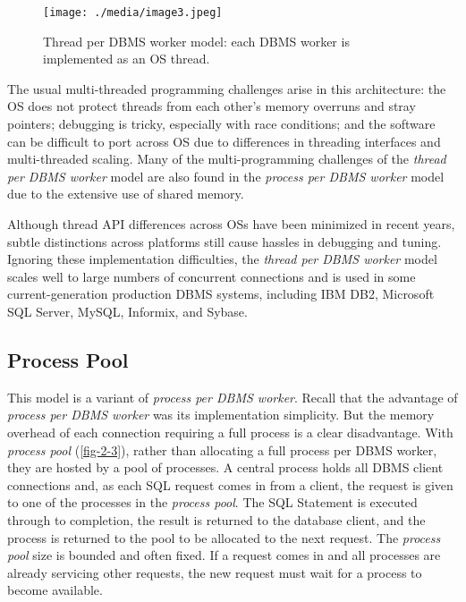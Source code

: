 \documentclass[a4paper,11pt,twoside,openright]{book}
\begin{document}
\begin{figure}
\centering
\texttt{[image: ./media/image3.jpeg]}

\caption{Thread per DBMS worker model: each DBMS worker is implemented
as an OS thread.\label{fig-2-2}}
\end{figure}

The usual multi-threaded programming challenges arise in this
architecture: the OS does not protect threads from each other's memory
overruns and stray pointers; debugging is tricky, especially with race
conditions; and the software can be difficult to port across OS due to
differences in threading interfaces and multi-threaded scaling. Many of
the multi-programming challenges of the \emph{thread per DBMS worker}
model are also found in the \emph{process per DBMS worker} model due to
the extensive use of shared memory.

Although thread API differences across OSs have been minimized in recent
years, subtle distinctions across platforms still cause hassles in
debugging and tuning. Ignoring these implementation difficulties, the
\emph{thread per DBMS worker} model scales well to large numbers of
concurrent connections and is used in some current-generation
production DBMS systems, including IBM DB2, Microsoft SQL Server, MySQL,
Informix, and Sybase.

\hypertarget{process-pool}{%
\subsection{Process Pool}\label{process-pool}}

This model is a variant of \emph{process per DBMS worker}. Recall that
the advantage of \emph{process per DBMS worker} was its implementation
simplicity. But the memory overhead of each connection requiring a full
process is a clear disadvantage. With \emph{process pool} (\autoref{fig-2-3}),
rather than allocating a full process per DBMS worker, they are hosted
by a pool of processes. A central process holds all DBMS client
connections and, as each SQL request comes in from a client, the request
is given to one of the processes in the \emph{process pool}. The SQL
Statement is executed through to completion, the result is returned to
the database client, and the process is returned to the pool to be
allocated to the next request. The \emph{process pool} size is bounded
and often fixed. If a request comes in
and all processes are already servicing other requests, the new request
must wait for a process to become available.
\end{document}
